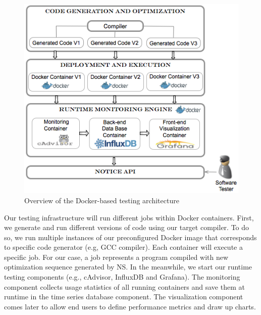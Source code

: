 \begin{figure}[h]
\centering
	\includegraphics[width=1.\linewidth]{Ressources/genecoApproach.png}
	\caption{Overview of the Docker-based testing architecture}
\end{figure}


Our testing infrastructure will run different jobs within Docker containers. First, we generate and run different versions of code using our target compiler. To do so, we run multiple instances of our preconfigured Docker image that corresponds to specific code generator (e.g, GCC compiler). Each container will execute a specific job. For our case, a job represents a program compiled with new optimization sequence generated by NS. In the meanwhile, we start our runtime testing components (e.g., cAdvisor, InfluxDB and Grafana). The monitoring component collects usage statistics of all running containers and save them at runtime in the time series database component. The visualization component comes later to allow end users to define performance metrics and draw up charts.

